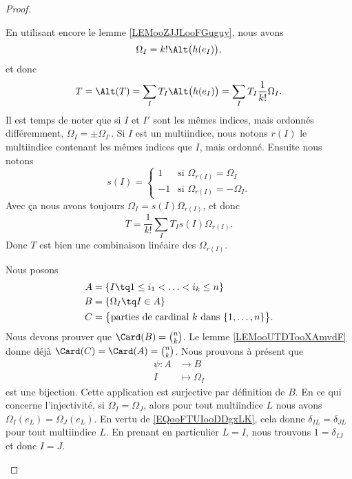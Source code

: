 \begin{proof}
\begin{subproof}
		En utilisant encore le lemme \ref{LEMooZJJLooFGuguy}, nous avons
		\begin{equation}
			\Omega_I=k!\Alt\big( h(e_I) \big),
		\end{equation}
		et donc
		\begin{equation}
			T=\Alt(T)=\sum_IT_I\Alt\big( h(e_I) \big)=\sum_IT_I\frac{1}{ k!}\Omega_I.
		\end{equation}
		Il est temps de noter que si \( I\) et \( I'\) sont les mêmes indices, mais ordonnés différemment, \( \Omega_{I}=\pm \Omega_{I'}\). Si \( I\) est un multiindice, nous notons \( r(I)\) le multiindice contenant les mêmes indices que \( I\), mais ordonné. Ensuite nous notons
		\begin{equation}
			s(I)=\begin{cases}
				1  & \text{si } \Omega_{r(I)}=\Omega_I   \\
				-1 & \text{si } \Omega_{r(I)}=-\Omega_I.
			\end{cases}
		\end{equation}
		Avec ça nous avons toujours \( \Omega_I=s(I)\Omega_{r(I)}\), et donc
		\begin{equation}
			T=\frac{1}{ k!}\sum_IT_Is(I)\Omega_{r(I)}.
		\end{equation}
		Donc \( T\) est bien une combinaison linéaire des \( \Omega_{r(I)}\).


		\spitem[Cardinal]
		Nous posons
		\begin{subequations}
			\begin{align}
				A & =\{ I\tq 1\leq i_1<\ldots <i_k\leq n \}                                      \\
				B & =\{ \Omega_I\tq I\in A \}                                                    \\
				C & =\big\{ \text{parties de cardinal \( k\) dans \( \{ 1,\ldots,n \}\)} \big\}.
			\end{align}
		\end{subequations}
		Nous devons prouver que \( \Card(B)=\binom{n}{k}\). Le lemme \ref{LEMooUTDTooXAmvdF} donne déjà \( \Card(C)=\Card(A)=\binom{ n }{ k }\). Nous prouvons à présent que
		\begin{equation}
			\begin{aligned}
				\psi\colon A & \to B            \\
				I            & \mapsto \Omega_I
			\end{aligned}
		\end{equation}
		est une bijection. Cette application est surjective par définition de \( B\). En ce qui concerne l'injectivité, si \( \Omega_I=\Omega_J\), alors pour tout multiindice \( L\) nous avons \( \Omega_I(e_L)=\Omega_J(e_L)\). En vertu de \eqref{EQooFTUIooDDgxLK}, cela donne \( \delta_{IL}=\delta_{JL}\) pour tout multiindice \( L\). En prenant en particulier \( L=I\), nous trouvons \( 1=\delta_{IJ}\) et donc \( I=J\).
	\end{subproof}
\end{proof}

